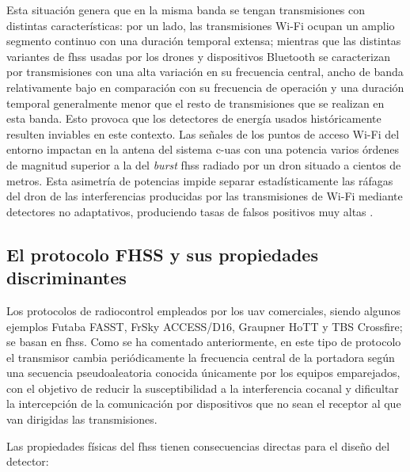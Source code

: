 Esta situación genera que en la misma banda se tengan transmisiones con distintas características: por un lado, las transmisiones Wi-Fi ocupan un amplio segmento continuo con una duración temporal extensa; mientras que las distintas variantes de \gls{fhss} usadas por los drones y dispositivos Bluetooth se caracterizan por transmisiones con una alta variación en su frecuencia central, ancho de banda relativamente bajo en comparación con su frecuencia de operación y una duración temporal generalmente menor que el resto de transmisiones que se realizan en esta banda. Esto provoca que los detectores de energía usados históricamente resulten inviables en este contexto. Las señales de los puntos de acceso Wi-Fi del entorno impactan en la antena del sistema \gls{c-uas} con una potencia varios órdenes de magnitud superior a la del \textit{burst} \gls{fhss} radiado por un dron situado a cientos de metros. Esta asimetría de potencias impide separar estadísticamente las ráfagas del dron de las interferencias producidas por las transmisiones de Wi-Fi mediante detectores no adaptativos, produciendo tasas de falsos positivos muy altas \cite{wang_rf-based, Swinney_rf-detection}.

\subsection{El protocolo FHSS y sus propiedades discriminantes}
\label{subsec:fhss}

Los protocolos de radiocontrol empleados por los \gls{uav} comerciales, siendo algunos ejemplos Futaba FASST, FrSky ACCESS/D16, Graupner HoTT y TBS Crossfire; se basan en \gls{fhss}. Como se ha comentado anteriormente, en este tipo de protocolo el transmisor cambia periódicamente la frecuencia central de la portadora según una secuencia pseudoaleatoria conocida únicamente por los equipos emparejados, con el objetivo de reducir la susceptibilidad a la interferencia cocanal y dificultar la intercepción de la comunicación por dispositivos que no sean el receptor al que van dirigidas las transmisiones.

Las propiedades físicas del \gls{fhss} tienen consecuencias directas para el diseño del detector:

